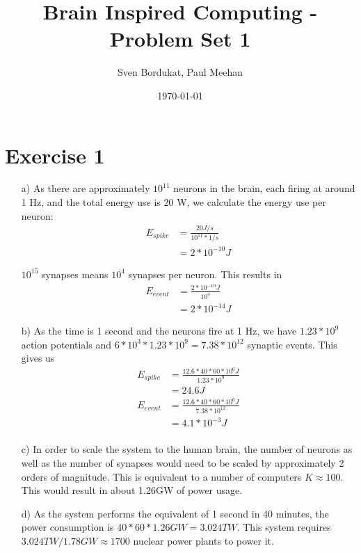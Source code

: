 \documentclass[a4paper]{article}
\begin{document}

\title{Brain Inspired Computing - Problem Set 1}

\author{Sven Bordukat, Paul Meehan}

\date{\today}

\maketitle

\section*{Exercise 1}
\begin{itemize}
\item[a)]
As there are approximately $10^{11}$ neurons in the brain, each firing at around
1 Hz, and the total energy use is 20 W, we calculate the energy use per neuron:
\begin{align*}
    E_{spike} &= \frac{20 J/s}{10^{11}*1/s}\\
    &= 2 * 10^{-10} J
\end{align*}

$10^{15}$ synapses means $10^{4}$ synapses per neuron. This results in
\begin{align*}
    E_{event} &= \frac{2*10^{-10} J}{10^{4}}\\
    &= 2*10^{-14} J
\end{align*}

\item[b)]
As the time is 1 second and the neurons fire at 1 Hz, we have $1.23*10^9$
action potentials and $6*10^3*1.23*10^9=7.38*10^{12}$ synaptic events.
This gives us
\begin{align*}
    E_{spike} &= \frac{12.6*40*60*10^6 J}{1.23*10^9}\\
    &= 24.6J \\
    E_{event} &= \frac{12.6*40*60*10^6 J}{7.38*10^{12}}\\
    &= 4.1*10^{-3}J\\
\end{align*}

\item[c)]
In order to scale the system to the human brain, the number of neurons as well
as the number of synapses would need to be scaled by approximately 2 orders of
magnitude. This is equivalent to a number of computers $K\approx100$. This would
result in about 1.26GW of power usage.
\item[d)]
As the system performs the equivalent of 1 second in 40 minutes, the power consumption
is $40*60*1.26GW=3.024TW$. This system requires $3.024TW/1.78GW\approx1700$ nuclear
power plants to power it.

\end{itemize}
\end{document}
